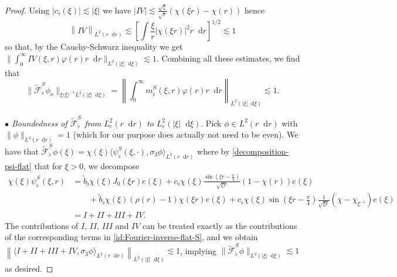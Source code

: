 \documentclass[11 pt]{amsart}
\theoremstyle{definition}
\theoremstyle{remark}
\numberwithin{equation}{section}
\newcommand{\dd}{\mathop{}\!\mathrm{d}}
\begin{document}
\begin{proof}
Using $|c_\flat(\xi)|\lesssim |\xi|$ we have $|IV|\lesssim \frac{\sqrt{\xi}}{\sqrt{r}}(\chi(\xi r)-\chi(r))$ hence
$$
\left\| IV  \right\|_{L^2(r \dd r)} \lesssim \left[ \int \frac{\xi}{ r} |\chi(\xi r)|^2  r \dd r \right]^{1/2} \lesssim 1
$$
so that, by the Cauchy-Schwarz inequality we get $\| \int_0^\infty IV(\xi,r) \varphi(r)r\dd r  \|_{L^2(|\xi| \dd \xi)} \lesssim 1$. Combining all these estimates, we find that
$$
\| \widetilde{\mathcal F}_\flat^S \phi_o \|_{\xi \langle \xi \rangle^{-1}L^2(|\xi|\dd \xi)}=\left\| \int_0^\infty m^S_\flat(\xi,r) \varphi(r)r\dd r   \right\|_{L^2(|\xi|\dd \xi)} \lesssim 1.
$$

\smallskip

\noindent \textit{$\bullet$ Boundedness of $\widetilde{\mathcal F}_\flat^S$ from $L^2_{e} (r\dd r)$ to $L^2_{e}(|\xi|\dd \xi)$}. Pick $\phi \in L^2(r\dd r)$ with $\| \phi\|_{L^2(r\dd r)}= 1$ (which for our purpose does actually not need to be even). We have that $\widetilde{\mathcal F}_\flat^S\phi(\xi)=\chi(\xi)\langle \psi^S_\flat(\xi,\cdot),\sigma_3 \phi\rangle_{L^2(r\dd r)}$ where by \eqref{decomposition-psi-flat} that for $\xi>0$, we decompose
\begin{align}
\label{decomposition:psi-flat-S-L2-continuity} \chi(\xi)\psi_\flat^S(\xi,r) & = \widetilde b_\flat \chi(\xi) J_0(\xi r) e(\xi) +c_\flat \chi(\xi)  \frac{\sin (\xi r-\frac \pi 4)}{\sqrt{\xi r}}(1-\chi(r))e(\xi) \\
\nonumber & \qquad  + \widetilde b_\flat \chi(\xi) (\rho(r)-1) \chi(\xi r)e(\xi) +c_\flat  \chi(\xi)   \sin \left(\xi r-\frac \pi 4 \right) \frac{1}{\sqrt{\xi r}} (\chi-\chi_{\xi^{-1}}) e(\xi)\ \\
\nonumber & = I+II+III+IV .
\end{align}
The contributions of $I$, $II$, $III$ and $IV$ can be treated exactly as the contributions of the corresponding terms in \eqref{id:Fourier-inverse-flat-S}, and we obtain $\left\| \langle I+II+III+IV ,\sigma_3 \phi\rangle_{L^2(r\dd r)} \right\|_{L^2(|\xi| \dd \xi)} \lesssim 1$, implying $\| \widetilde{\mathcal F}_\flat^S\phi \|_{L^2(|\xi|\dd \xi)}\lesssim 1$ as desired.

\smallskip


\end{proof}
\end{document}

